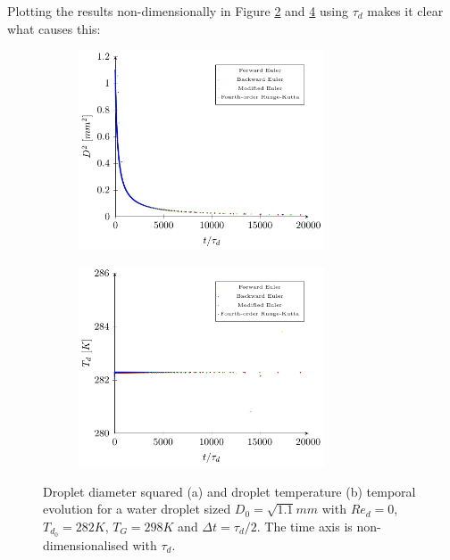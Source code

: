 \documentclass[../Interim_Report_Master]{subfiles}
\begin{document}
Plotting the results non-dimensionally in Figure \ref{coupled_d2_tau_2_nd} and \ref{coupled_heat_tau_2_nd} using $\tau_d$ makes it clear what causes this:
\begin{figure}[H]
	\centering
	\begin{subfigure}{\textwidth}
		\centering
		\includegraphics[width=0.8\textwidth]{./Diagrams/Coupled_Heat_Mass_Transfer_tau_2_nd/Coupled_d2_Transfer_tau_2_nd.pdf}
		\caption{}
		\label{coupled_d2_tau_2_nd}
	\end{subfigure}
\end{figure}
\begin{figure}\ContinuedFloat
\centering
\begin{subfigure}{\textwidth}
	\centering
	\includegraphics[width=0.8\textwidth]{./Diagrams/Coupled_Heat_Mass_Transfer_tau_2_nd/Coupled_Heat_Transfer_tau_2_nd.pdf}
	\caption{}
	\label{coupled_heat_tau_2_nd}
\end{subfigure}
\caption{Droplet diameter squared (a) and droplet temperature (b) temporal evolution for a water droplet sized $D_0=\sqrt{1.1}mm$ with $Re_d=0$, $T_{d_0}=282K$, $T_G=298K$ and $\Delta t=\tau_d/2$. The time axis is non-dimensionalised with $\tau_d$.}
\end{figure}
\end{document}
